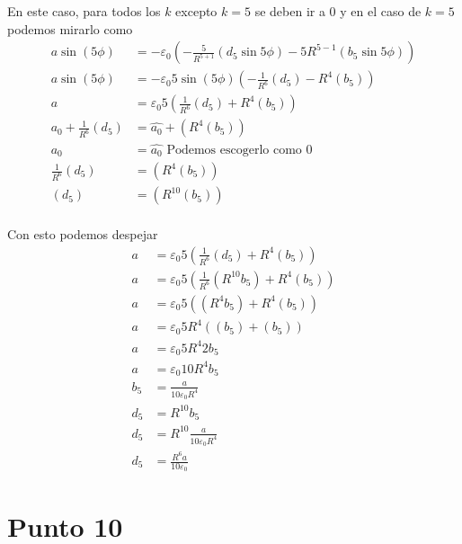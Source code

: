 \documentclass{report}
\begin{document}
En este caso, para todos los $k$ excepto $k = 5$ se deben ir a 0 y en el caso de $k = 5$ podemos mirarlo como
\begin{align*}
	a\sin \left( 5\phi \right)&= - \varepsilon_0 \left( - \frac{5}{R^{5+1}}\left( d_5 \sin 5\phi \right) - 5 R^{5 - 1}\left( b_5 \sin 5 \phi \right) \right)\\
	a\sin \left( 5\phi \right)&= - \varepsilon_0 5 \sin \left( 5\phi \right) \left( - \frac{1}{R^{6}}\left( d_5 \right) - R^{4}\left( b_5 \right)\right)\\
	a &= \varepsilon_0 5 \left( \frac{1}{R^{6}}\left( d_5 \right) + R^{4}\left( b_5 \right)\right)\\
	a_0 + \frac{1}{R^{6}}\left( d_5 \right) &= \hat{a_0} + \left(  R^{4}\left( b_5 \right)\right)\\
	a_0 &= \hat{a_0} \text{ Podemos escogerlo como }0\\
	\frac{1}{R^{6}}\left( d_5 \right) &= \left(  R^{4}\left( b_5 \right)\right)\\
	\left( d_5 \right) &= \left(  R^{10}\left( b_5 \right)\right)\\
\end{align*}

Con esto podemos despejar
\begin{align*}
	a &= \varepsilon_0 5 \left( \frac{1}{R^{6}}\left( d_5 \right) + R^{4}\left( b_5 \right)\right)\\
	a &= \varepsilon_0 5 \left( \frac{1}{R^{6}}\left( R^{10} b_5 \right) + R^{4}\left( b_5 \right)\right)\\
	a &= \varepsilon_0 5 \left( \left( R^{4} b_5 \right) + R^{4}\left( b_5 \right)\right)\\
	a &= \varepsilon_0 5 R^{4}\left( \left( b_5 \right) + \left( b_5 \right)\right)\\
	a &= \varepsilon_0 5 R^{4} 2 b_5\\
	a &= \varepsilon_0 10 R^{4} b_5\\
	b_5 &= \frac{a}{10 \varepsilon_0 R^{4} }\\
	d_5 &= R^{10}b_5\\
	d_5 &= R^{10}\frac{a}{10 \varepsilon_0 R^{4} }\\
	d_5 &= \frac{R^{6} a}{10 \varepsilon_0 }
\end{align*}

\chapter{Punto 10}
\end{document}
